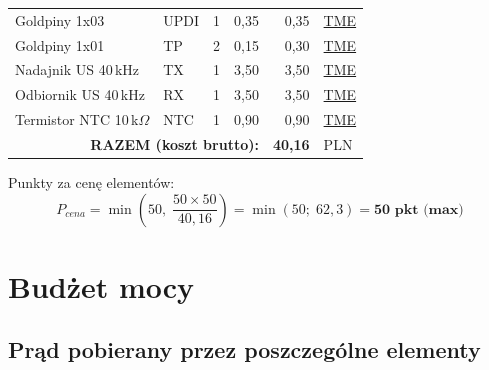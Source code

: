 \documentclass[a4paper,11pt]{article}
\begin{document}
\begin{table}[H]
\begin{tabular}{llrrrl}
        Goldpiny 1x03 & UPDI & 1 & 0,35 & 0,35 &
            \href{https://www.tme.eu/pl/}{TME} \\
        Goldpiny 1x01 & TP & 2 & 0,15 & 0,30 &
            \href{https://www.tme.eu/pl/}{TME} \\
        Nadajnik US 40\,kHz & TX & 1 & 3,50 & 3,50 &
            \href{https://www.tme.eu/pl/}{TME} \\
        Odbiornik US 40\,kHz & RX & 1 & 3,50 & 3,50 &
            \href{https://www.tme.eu/pl/}{TME} \\
        Termistor NTC 10\,k$\Omega$ & NTC & 1 & 0,90 & 0,90 &
            \href{https://www.tme.eu/pl/}{TME} \\
        \midrule
        \multicolumn{4}{r}{\textbf{RAZEM (koszt brutto):}} & \textbf{40,16} & PLN \\
        \bottomrule
    \end{tabular}
\end{table}

Punkty za cenę elementów:
\begin{equation}
    P_{cena} = \min\!\left(50,\; \frac{50 \times 50}{40{,}16}\right)
    = \min(50;\; 62{,}3) = \textbf{50~pkt~(max)}
    \label{eq:pkt_cena}
\end{equation}


\section{Budżet mocy}
\label{sec:moc}

\subsection{Prąd pobierany przez poszczególne elementy}
\end{document}
